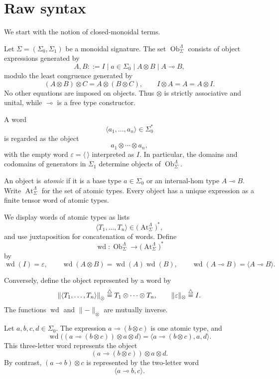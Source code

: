 \section{Raw syntax}
We start with the notion of closed-monoidal terms.

\begin{definition}[Objects]
Let $\Sigma=(\Sigma_0,\Sigma_1)$ be a monoidal signature.
The set $\operatorname{Ob}^{\Lambda}_{\Sigma}$ consists of
object expressions generated by
\[
  A,B ::= I \mid a \in \Sigma_0
          \mid A \otimes B
          \mid A \multimap B,
\]
modulo the least congruence generated by
\[
  (A \otimes B) \otimes C = A \otimes (B \otimes C),
  \qquad
  I \otimes A = A = A \otimes I.
\]
No other equations are imposed on objects. Thus $\otimes$ is strictly
associative and unital, while $\multimap$ is a free type constructor.

A word
\[
  \langle a_1,\ldots,a_n\rangle\in\Sigma_0^*
\]
is regarded as the object
\[
  a_1\otimes\cdots\otimes a_n,
\]
with the empty word \(\varepsilon=\langle\,\rangle\) interpreted as
\(I\). In particular, the domains and codomains of generators in
\(\Sigma_1\) determine objects of
\(\operatorname{Ob}^{\Lambda}_{\Sigma}\).

An object is \emph{atomic} if it is a base type \(a\in\Sigma_0\) or an
internal-hom type \(A\multimap B\). Write
\(\operatorname{At}^{\Lambda}_{\Sigma}\) for the set of atomic types.
Every object has a unique expression as a finite tensor word of atomic
types.

We display words of atomic types as lists
\[
  \langle T_1,\ldots,T_n\rangle
  \in
  \bigl(\operatorname{At}^{\Lambda}_{\Sigma}\bigr)^*,
\]
and use juxtaposition for concatenation of words. Define
\[
  \operatorname{wd}:
  \operatorname{Ob}^{\Lambda}_{\Sigma}
  \longrightarrow
  \bigl(\operatorname{At}^{\Lambda}_{\Sigma}\bigr)^*
\]
by
\[
  \operatorname{wd}(I)=\varepsilon,
  \qquad
  \operatorname{wd}(A\otimes B)
  =
  \operatorname{wd}(A)\operatorname{wd}(B),
  \qquad
  \operatorname{wd}(A\multimap B)
  =
  \langle A\multimap B\rangle.
\]

Conversely, define the object represented by a word by
\[
  \left\lVert\langle T_1,\ldots,T_n\rangle\right\rVert_{\otimes}
  \stackrel{\triangle}{=}
  T_1\otimes\cdots\otimes T_n,
  \qquad
  \lVert\varepsilon\rVert_{\otimes}\stackrel{\triangle}{=} I.
\]
The functions \(\operatorname{wd}\) and
\(\lVert-\rVert_{\otimes}\) are mutually inverse.
\end{definition}

\begin{example}
Let \(a,b,c,d\in\Sigma_0\). The expression
\(a\multimap(b\otimes c)\) is one atomic type, and
\[
  \operatorname{wd}
  \bigl((a\multimap(b\otimes c))\otimes a\otimes d\bigr)
  =
  \langle a\multimap(b\otimes c),a,d\rangle.
\]
This three-letter word represents the object
\[
  (a\multimap(b\otimes c))\otimes a\otimes d.
\]
By contrast, \((a\multimap b)\otimes c\) is represented by the
two-letter word
\[
  \langle a\multimap b,c\rangle.
\]
\end{example}

